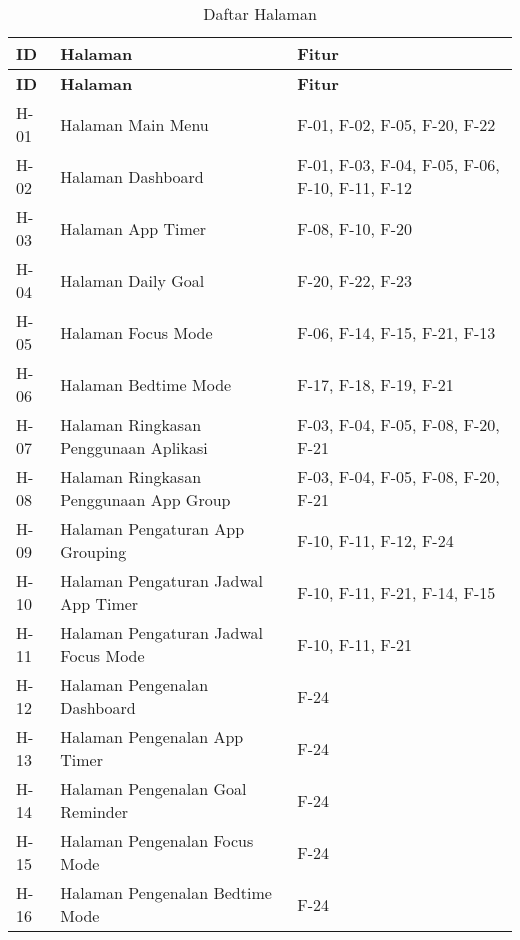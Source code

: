 \RaggedLeft
\begin{small}
\begin{longtable}[c]{|W{c}{0.06\textwidth}|>{\ccnormspacing}m{0.4\textwidth}|>{\ccnormspacing}m{0.4\textwidth}|}
  \caption{Daftar Halaman}
  \label{tab:daftar_halaman} \\
  \hline {}
  \textbf{ID} & \textbf{Halaman} & \textbf{Fitur} \\ \hline \endfirsthead
  \hline {}
  \textbf{ID} & \textbf{Halaman} & \textbf{Fitur} \\ \hline \endhead
  \hline \endfoot

  H-01 & Halaman Main Menu & F-01, F-02, F-05, F-20, F-22 \\ \hline
  H-02 & Halaman Dashboard & F-01, F-03, F-04, F-05, F-06, F-10, F-11, F-12 \\ \hline
  H-03 & Halaman App Timer & F-08, F-10, F-20 \\ \hline
  H-04 & Halaman Daily Goal & F-20, F-22, F-23 \\ \hline
  H-05 & Halaman Focus Mode & F-06, F-14, F-15, F-21, F-13 \\ \hline
  H-06 & Halaman Bedtime Mode & F-17, F-18, F-19, F-21 \\ \hline
  H-07 & Halaman Ringkasan Penggunaan Aplikasi & F-03, F-04, F-05, F-08, F-20, F-21 \\ \hline
  H-08 & Halaman Ringkasan Penggunaan App Group & F-03, F-04, F-05, F-08, F-20, F-21 \\ \hline
  H-09 & Halaman Pengaturan App Grouping & F-10, F-11, F-12, F-24 \\ \hline
  H-10 & Halaman Pengaturan Jadwal App Timer & F-10, F-11, F-21, F-14, F-15 \\ \hline
  H-11 & Halaman Pengaturan Jadwal Focus Mode & F-10, F-11, F-21 \\ \hline
  H-12 & Halaman Pengenalan Dashboard & F-24 \\ \hline
  H-13 & Halaman Pengenalan App Timer & F-24 \\ \hline
  H-14 & Halaman Pengenalan Goal Reminder & F-24 \\ \hline
  H-15 & Halaman Pengenalan Focus Mode & F-24 \\ \hline
  H-16 & Halaman Pengenalan Bedtime Mode & F-24 \\ \hline
  
\end{longtable}
\end{small}
\justifying
\FloatBarrier

